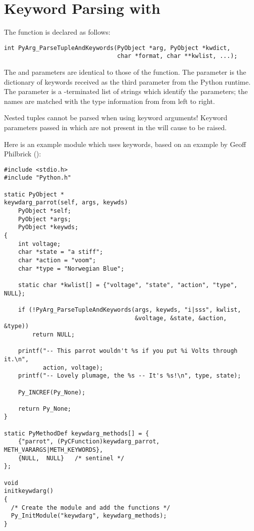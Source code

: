 \documentclass{manual}
\begin{document}
\section{Keyword Parsing with 
         \label{parseTupleAndKeywords}}

The  function is declared as
follows:

\begin{verbatim}
int PyArg_ParseTupleAndKeywords(PyObject *arg, PyObject *kwdict,
                                char *format, char **kwlist, ...);
\end{verbatim}

The  and  parameters are identical to those of the
 function.  The  parameter
is the dictionary of keywords received as the third parameter from the 
Python runtime.  The  parameter is a \NULL{}-terminated
list of strings which identify the parameters; the names are matched
with the type information from  from left to right.

  Nested tuples cannot be parsed when using keyword
arguments!  Keyword parameters passed in which are not present in the
 will cause  to be raised.

Here is an example module which uses keywords, based on an example by
Geoff Philbrick ():%

\begin{verbatim}
#include <stdio.h>
#include "Python.h"

static PyObject *
keywdarg_parrot(self, args, keywds)
    PyObject *self;
    PyObject *args;
    PyObject *keywds;
{  
    int voltage;
    char *state = "a stiff";
    char *action = "voom";
    char *type = "Norwegian Blue";

    static char *kwlist[] = {"voltage", "state", "action", "type", NULL};

    if (!PyArg_ParseTupleAndKeywords(args, keywds, "i|sss", kwlist, 
                                     &voltage, &state, &action, &type))
        return NULL; 
  
    printf("-- This parrot wouldn't %s if you put %i Volts through it.\n", 
           action, voltage);
    printf("-- Lovely plumage, the %s -- It's %s!\n", type, state);

    Py_INCREF(Py_None);

    return Py_None;
}

static PyMethodDef keywdarg_methods[] = {
    {"parrot", (PyCFunction)keywdarg_parrot, METH_VARARGS|METH_KEYWORDS},
    {NULL,  NULL}   /* sentinel */
};

void
initkeywdarg()
{
  /* Create the module and add the functions */
  Py_InitModule("keywdarg", keywdarg_methods);
}
\end{verbatim}
\end{document}
